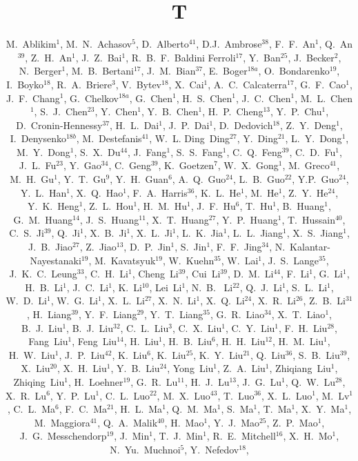 \begin{frontmatter}
\title{T}
\author{
\begin{small}
M.~Ablikim$^{1}$, M.~N.~Achasov$^{5}$, D.~Alberto$^{41}$, D.J.~Ambrose$^{38}$, F.~F.~An$^{1}$, Q.~An$^{39}$, Z.~H.~An$^{1}$, J.~Z.~Bai$^{1}$, R.~B.~F.~Baldini Ferroli$^{17}$, Y.~Ban$^{25}$, J.~Becker$^{2}$, N.~Berger$^{1}$, M.~B.~Bertani$^{17}$, J.~M.~Bian$^{37}$, E.~Boger$^{18a}$, O.~Bondarenko$^{19}$, I.~Boyko$^{18}$, R.~A.~Briere$^{3}$, V.~Bytev$^{18}$, X.~Cai$^{1}$, A.~C.~Calcaterra$^{17}$, G.~F.~Cao$^{1}$, J.~F.~Chang$^{1}$, G.~Chelkov$^{18a}$, G.~Chen$^{1}$, H.~S.~Chen$^{1}$, J.~C.~Chen$^{1}$, M.~L.~Chen$^{1}$, S.~J.~Chen$^{23}$, Y.~Chen$^{1}$, Y.~B.~Chen$^{1}$, H.~P.~Cheng$^{13}$, Y.~P.~Chu$^{1}$, D.~Cronin-Hennessy$^{37}$, H.~L.~Dai$^{1}$, J.~P.~Dai$^{1}$, D.~Dedovich$^{18}$, Z.~Y.~Deng$^{1}$, I.~Denysenko$^{18b}$, M.~Destefanis$^{41}$, W.~L. Ding~Ding$^{27}$, Y.~Ding$^{21}$, L.~Y.~Dong$^{1}$, M.~Y.~Dong$^{1}$, S.~X.~Du$^{44}$, J.~Fang$^{1}$, S.~S.~Fang$^{1}$, C.~Q.~Feng$^{39}$, C.~D.~Fu$^{1}$, J.~L.~Fu$^{23}$, Y.~Gao$^{34}$, C.~Geng$^{39}$, K.~Goetzen$^{7}$, W.~X.~Gong$^{1}$, M.~Greco$^{41}$, M.~H.~Gu$^{1}$, Y.~T.~Gu$^{9}$, Y.~H.~Guan$^{6}$, A.~Q.~Guo$^{24}$, L.~B.~Guo$^{22}$, Y.P.~Guo$^{24}$, Y.~L.~Han$^{1}$, X.~Q.~Hao$^{1}$, F.~A.~Harris$^{36}$, K.~L.~He$^{1}$, M.~He$^{1}$, Z.~Y.~He$^{24}$, Y.~K.~Heng$^{1}$, Z.~L.~Hou$^{1}$, H.~M.~Hu$^{1}$, J.~F.~Hu$^{6}$, T.~Hu$^{1}$, B.~Huang$^{1}$, G.~M.~Huang$^{14}$, J.~S.~Huang$^{11}$, X.~T.~Huang$^{27}$, Y.~P.~Huang$^{1}$, T.~Hussain$^{40}$, C.~S.~Ji$^{39}$, Q.~Ji$^{1}$, X.~B.~Ji$^{1}$, X.~L.~Ji$^{1}$, L.~K.~Jia$^{1}$, L.~L.~Jiang$^{1}$, X.~S.~Jiang$^{1}$, J.~B.~Jiao$^{27}$, Z.~Jiao$^{13}$, D.~P.~Jin$^{1}$, S.~Jin$^{1}$, F.~F.~Jing$^{34}$, N.~Kalantar-Nayestanaki$^{19}$, M.~Kavatsyuk$^{19}$, W.~Kuehn$^{35}$, W.~Lai$^{1}$, J.~S.~Lange$^{35}$, J.~K.~C.~Leung$^{33}$, C.~H.~Li$^{1}$, Cheng~Li$^{39}$, Cui~Li$^{39}$, D.~M.~Li$^{44}$, F.~Li$^{1}$, G.~Li$^{1}$, H.~B.~Li$^{1}$, J.~C.~Li$^{1}$, K.~Li$^{10}$, Lei~Li$^{1}$, N.~B. ~Li$^{22}$, Q.~J.~Li$^{1}$, S.~L.~Li$^{1}$, W.~D.~Li$^{1}$, W.~G.~Li$^{1}$, X.~L.~Li$^{27}$, X.~N.~Li$^{1}$, X.~Q.~Li$^{24}$, X.~R.~Li$^{26}$, Z.~B.~Li$^{31}$, H.~Liang$^{39}$, Y.~F.~Liang$^{29}$, Y.~T.~Liang$^{35}$, G.~R.~Liao$^{34}$, X.~T.~Liao$^{1}$, B.~J.~Liu$^{1}$, B.~J.~Liu$^{32}$, C.~L.~Liu$^{3}$, C.~X.~Liu$^{1}$, C.~Y.~Liu$^{1}$, F.~H.~Liu$^{28}$, Fang~Liu$^{1}$, Feng~Liu$^{14}$, H.~Liu$^{1}$, H.~B.~Liu$^{6}$, H.~H.~Liu$^{12}$, H.~M.~Liu$^{1}$, H.~W.~Liu$^{1}$, J.~P.~Liu$^{42}$, K.~Liu$^{6}$, K.~Liu$^{25}$, K.~Y.~Liu$^{21}$, Q.~Liu$^{36}$, S.~B.~Liu$^{39}$, X.~Liu$^{20}$, X.~H.~Liu$^{1}$, Y.~B.~Liu$^{24}$, Yong~Liu$^{1}$, Z.~A.~Liu$^{1}$, Zhiqiang~Liu$^{1}$, Zhiqing~Liu$^{1}$, H.~Loehner$^{19}$, G.~R.~Lu$^{11}$, H.~J.~Lu$^{13}$, J.~G.~Lu$^{1}$, Q.~W.~Lu$^{28}$, X.~R.~Lu$^{6}$, Y.~P.~Lu$^{1}$, C.~L.~Luo$^{22}$, M.~X.~Luo$^{43}$, T.~Luo$^{36}$, X.~L.~Luo$^{1}$, M.~Lv$^{1}$, C.~L.~Ma$^{6}$, F.~C.~Ma$^{21}$, H.~L.~Ma$^{1}$, Q.~M.~Ma$^{1}$, S.~Ma$^{1}$, T.~Ma$^{1}$, X.~Y.~Ma$^{1}$, M.~Maggiora$^{41}$, Q.~A.~Malik$^{40}$, H.~Mao$^{1}$, Y.~J.~Mao$^{25}$, Z.~P.~Mao$^{1}$, J.~G.~Messchendorp$^{19}$, J.~Min$^{1}$, T.~J.~Min$^{1}$, R.~E.~Mitchell$^{16}$, X.~H.~Mo$^{1}$, N.~Yu.~Muchnoi$^{5}$, Y.~Nefedov$^{18}$, 
\end{small}}
\end{frontmatter}
